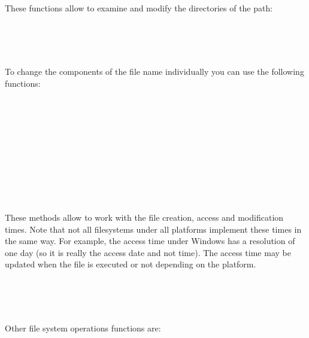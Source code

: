 
These functions allow to examine and modify the directories of the path:

\\
\\
\\

To change the components of the file name individually you can use the
following functions:

\\
\\
\\
\\
\\
\\
\\
\\
\\



These methods allow to work with the file creation, access and modification
times. Note that not all filesystems under all platforms implement these times
in the same way. For example, the access time under Windows has a resolution of
one day (so it is really the access date and not time). The access time may be
updated when the file is executed or not depending on the platform.

\\
\\
\\

Other file system operations functions are:

\\



